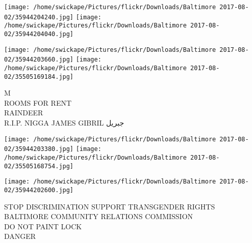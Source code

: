\documentclass[10pt,letterpaper]{article}
\begin{document}
\texttt{[image: /home/swickape/Pictures/flickr/Downloads/Baltimore 2017-08-02/35944204240.jpg]}
\texttt{[image: /home/swickape/Pictures/flickr/Downloads/Baltimore 2017-08-02/35944204040.jpg]}

\texttt{[image: /home/swickape/Pictures/flickr/Downloads/Baltimore 2017-08-02/35944203660.jpg]}
\texttt{[image: /home/swickape/Pictures/flickr/Downloads/Baltimore 2017-08-02/35505169184.jpg]}

M\\
ROOMS FOR RENT\\
RAINDEER\\
R.I.P. NIGGA JAMES GIBRIL جبريل
\pagebreak

\texttt{[image: /home/swickape/Pictures/flickr/Downloads/Baltimore 2017-08-02/35944203380.jpg]}
\texttt{[image: /home/swickape/Pictures/flickr/Downloads/Baltimore 2017-08-02/35505168754.jpg]}

\texttt{[image: /home/swickape/Pictures/flickr/Downloads/Baltimore 2017-08-02/35944202600.jpg]}

STOP DISCRIMINATION SUPPORT TRANSGENDER RIGHTS BALTIMORE COMMUNITY RELATIONS COMMISSION\\
DO NOT PAINT LOCK\\
DANGER
\pagebreak
\end{document}
